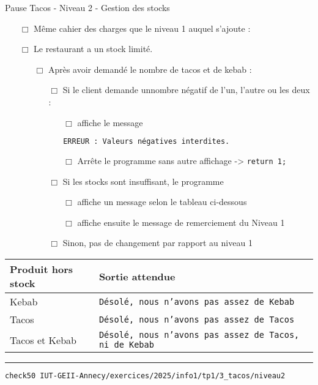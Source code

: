 \begin{UPSTIcahierDesCharges}{Pause Tacos - Niveau 2 - Gestion des stocks}
	\begin{itemize}
		\item[$\Box$] Même cahier des charges que le niveau 1 auquel s'ajoute :
		\item[$\Box$] Le restaurant a un stock limité.
		      \begin{itemize}
			      \item[$\Box$] Après avoir demandé le nombre de tacos et de kebab :
			            \begin{itemize}
				            \item[$\Box$] Si le client demande unnombre négatif de l'un, l'autre ou les deux :
				                  \begin{itemize}
					                  \item[$\Box$] affiche le message
					                        \begin{lstlisting}[language=bash,style=console]
			ERREUR : Valeurs négatives interdites.
\end{lstlisting}
					                  \item[$\Box$] Arrête le programme sans autre affichage -> \texttt{return 1;}
				                  \end{itemize}
				            \item[$\Box$] Si les stocks sont insuffisant, le programme
				                  \begin{itemize}
					                  \item[$\Box$] affiche un message selon le tableau ci-dessous
					                  \item[$\Box$] affiche ensuite le message de remerciement du Niveau 1
				                  \end{itemize}
				            \item[$\Box$] Sinon, pas de changement par rapport au niveau 1
			            \end{itemize}
		      \end{itemize}
	\end{itemize}

	\begin{center}
		\begin{tabular}{|l|l|}
			\hline
			Produit hors stock & Sortie attendue                                               \\
			\hline
			Kebab              & \texttt{Désolé, nous n'avons pas assez de Kebab}              \\
			Tacos              & \texttt{Désolé, nous n'avons pas assez de Tacos}              \\
			Tacos et Kebab     & \texttt{Désolé, nous n'avons pas assez de Tacos, ni de Kebab} \\
			\hline
		\end{tabular}
	\end{center}
	\hrule
	\begin{lstlisting}[language=bash,style=console]
check50 IUT-GEII-Annecy/exercices/2025/info1/tp1/3_tacos/niveau2
\end{lstlisting}
\end{UPSTIcahierDesCharges}

